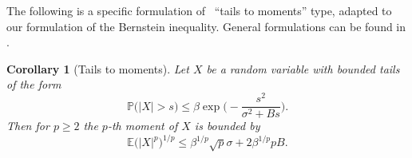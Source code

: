 \documentclass[11pt,reqno]{article}
\numberwithin{equation}{section}
\theoremstyle{definition}
\theoremstyle{plain}
\newtheorem{cor}[satz]{Corollary}
\newcommand{\E}{\ensuremath{\mathbb{E}}}
\newcommand{\p}{\ensuremath{\mathbb{P}}}
\begin{document}
The following is a specific formulation of ~``tails to moments'' type, adapted to our formulation of the Bernstein inequality. General formulations can be found in \cite[Section 7.2]{FoRa13}.
\begin{cor}[Tails to moments] \label{Mo_to_Ta}
    Let \( X \) be a random variable with bounded tails of the form 
    \begin{equation} \label{Tail}
    \p \Big( \big\vert X \big\vert > s \Big) \leq \beta\exp\Big(- \frac{s^2}{\sigma^2 + B s} \Big).
    \end{equation}
    Then for \(p\geq 2\)  the \(p\)-th moment of \(X\) is bounded by
\begin{equation} \label{Moment}
\E\big(\vert X \vert^p\big)^{1/p} \leq  \beta^{1/p}  \sqrt{p} \sigma + 2\beta^{1/p}  p B.
\end{equation}
\end{cor}
\end{document}
